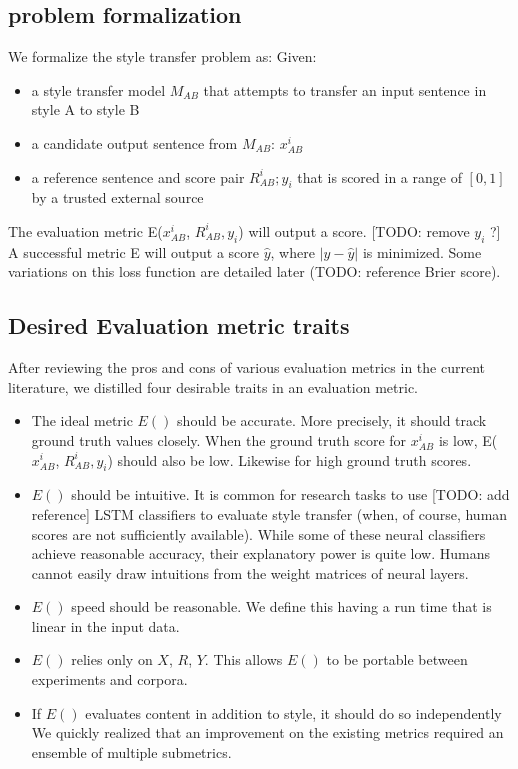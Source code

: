 \documentclass[letterpaper, 10 pt, conference]{ieeeconf}  %
\begin{document}
  \subsection{problem formalization} We formalize the style transfer problem as:
    Given:
    \begin{itemize}
      \item a style transfer model $M_{AB}$ that attempts to transfer an input sentence in style A to style B
      \item a candidate output sentence from $M_{AB}$:  $x_{AB}^i$
      \item a reference sentence and score pair $R_{AB}^i ; y_i$ that is scored in a range of $[0,1]$ by a trusted external source
    \end{itemize}

  The evaluation metric E($x_{AB}^i$, $R_{AB}^i, y_i$) will output a score. [TODO: remove $y_i$ ?] A successful metric E will output a score $\hat{y}$, where $|y-\hat{y}|$ is minimized. Some variations on this loss function are detailed later (TODO: reference Brier score).
  \subsection{Desired Evaluation metric traits}
      After reviewing the pros and cons of various evaluation metrics in the current literature, we distilled four desirable traits in an evaluation metric.
    \begin{itemize}

      \item The ideal metric $E()$ should be accurate. More precisely, it should track ground truth values closely. When the ground truth score for $x_{AB}^i$ is low, E($x_{AB}^i$, $R_{AB}^i, y_i$) should also be low. Likewise for high ground truth scores.
      \item $E()$ should be intuitive. It is common for research tasks to use [TODO: add reference] LSTM classifiers to evaluate style transfer (when, of course, human scores are not sufficiently available). While some of these neural classifiers achieve reasonable accuracy, their explanatory power is quite low. Humans cannot easily draw intuitions from the weight matrices of neural layers.
      \item $E()$ speed should be reasonable. We define this having a run time that is linear in the input data.
      \item $E()$ relies only on $X$, $R$, $Y$. This allows $E()$ to be portable between experiments and corpora.
      \item If $E()$ evaluates content in addition to style, it should do so independently
      We quickly realized that an improvement on the existing metrics required an ensemble of multiple submetrics.
    \end{itemize}
\end{document}
